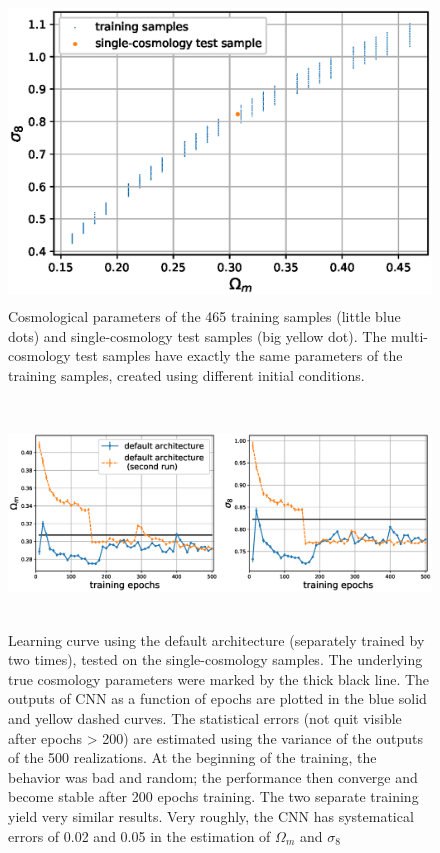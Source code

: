 \documentclass[twocolumn]{aastex61}
\begin{document}
\begin{figure}
   \centering
    \includegraphics[height=8cm]{train_grid.eps}
   \caption{\label{fig_train_grid}
   Cosmological parameters of the 465 training samples (little blue dots) and single-cosmology test samples (big yellow dot).
   The multi-cosmology test samples have exactly the same parameters of the training samples, created using different initial conditions.
   }
\end{figure}

\begin{figure}
   \centering
    \includegraphics[height=6cm]{lc_default.eps}
   \caption{\label{lc_default}
   Learning curve using the default architecture (separately trained by two times), 
   tested on the single-cosmology samples.
   The underlying true cosmology parameters were marked by the thick black line.
   The outputs of CNN as a function of epochs are plotted in the blue solid and yellow dashed curves.
   The statistical errors (not quit visible after epochs > 200) are estimated using the variance of the outputs of the 500 realizations. 
   At the beginning of the training, 
   the behavior was bad and random;
   the performance then converge and become stable after 200 epochs training.
   The two separate training yield very similar results.
   Very roughly, the CNN has systematical errors of 0.02 and 0.05 in the estimation of $\Omega_m$ and $\sigma_8$
   }
\end{figure}
\end{document}
